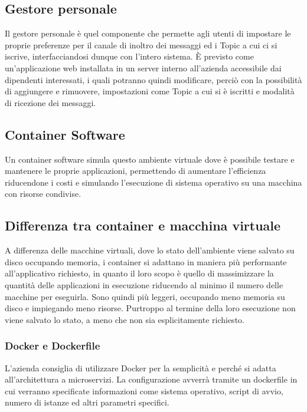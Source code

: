 	
	\subsection{Gestore personale}
	Il gestore personale è quel componente che permette agli utenti di impostare le proprie preferenze per il canale di inoltro dei messaggi ed i Topic a cui ci si iscrive, interfacciandosi dunque con l'intero sistema.
	È previsto come un'applicazione web installata in un server interno all'azienda accessibile dai dipendenti interessati, i quali potranno quindi modificare, perciò con la possibilità di aggiungere e rimuovere, impostazioni come Topic a cui si è iscritti e modalità di ricezione dei messaggi.
	
	\subsection{Container Software}
	
		Un container software simula questo ambiente virtuale dove è possibile testare e mantenere le proprie applicazioni, permettendo di aumentare l'efficienza riducendone i costi e simulando l'esecuzione di sistema operativo su una macchina con risorse condivise.
		
		\subsection{Differenza tra container e macchina virtuale}
		A differenza delle macchine virtuali, dove lo stato dell'ambiente viene salvato su disco occupando memoria, i container si adattano in maniera più performante all'applicativo richiesto, in quanto il loro scopo è quello di massimizzare la quantità delle applicazioni in esecuzione riducendo al minimo il numero delle macchine per eseguirla.
		Sono quindi più leggeri, occupando meno memoria su disco e impiegando meno risorse. Purtroppo al termine della loro esecuzione non viene salvato lo stato, a meno che non sia esplicitamente richiesto.
		
		\subsubsection{Docker e Dockerfile}
		L'azienda consiglia di utilizzare Docker per la semplicità e perché si adatta all'architettura a microservizi.
		La configurazione avverrà tramite un dockerfile in cui verranno specificate informazioni come sistema operativo, script di avvio, numero di istanze ed altri parametri specifici.

